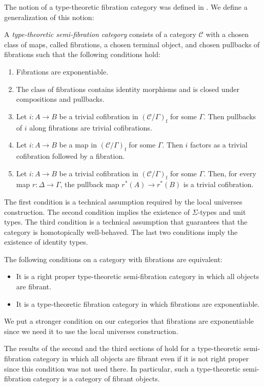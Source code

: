 \documentclass[reqno]{amsart}
\theoremstyle{definition}
\theoremstyle{remark}
\newcommand{\fs}[1]{\mathrm{#1}}
\newcommand{\scat}[1]{\mathcal{#1}}
\numberwithin{figure}{section}
\begin{document}
The notion of a type-theoretic fibration category was defined in \cite[Definition~2.1]{shul-inv}.
We define a generalization of this notion:
\begin{defn}[ttsfc]
A \emph{type-theoretic semi-fibration category} consists of a category $\scat{C}$ with a chosen class of maps, called fibrations, a chosen terminal object, and chosen pullbacks of fibrations such that the following conditions hold:
\begin{enumerate}
\item \label{it:ttsfc-pi} Fibrations are exponentiable.
\item \label{it:ttsfc-fib} The class of fibrations contains identity morphisms and is closed under compositions and pullbacks.
\item Let $i : A \to B$ be a trivial cofibration in $(\scat{C}/\Gamma)_\fs{f}$ for some $\Gamma$.
Then pullbacks of $i$ along fibrations are trivial cofibrations.
\item \label{it:ttsfc-factor} Let $i : A \to B$ be a map in $(\scat{C}/\Gamma)_\fs{f}$ for some $\Gamma$.
Then $i$ factors as a trivial cofibration followed by a fibration.
\item Let $i : A \to B$ be a trivial cofibration in $(\scat{C}/\Gamma)_\fs{f}$ for some $\Gamma$.
Then, for every map $r : \Delta \to \Gamma$, the pullback map $r^*(A) \to r^*(B)$ is a trivial cofibration.
\end{enumerate}
\end{defn}

The first condition is a technical assumption required by the local universes construction.
The second condition implies the existence of $\Sigma$-types and unit types.
The third condition is a technical assumption that guarantees that the category is homotopically well-behaved.
The last two conditions imply the existence of identity types.

The following conditions on a category with fibrations are equivalent:
\begin{itemize}
\item It is a right proper type-theoretic semi-fibration category in which all objects are fibrant.
\item It is a type-theoretic fibration category in which fibrations are exponentiable.
\end{itemize}
We put a stronger condition on our categories that fibrations are exponentiable since we need it to use the local universes construction.

\begin{remark}
The results of the second and the third sections of \cite{shul-inv} hold for a type-theoretic semi-fibration category in which all objects are fibrant even if it is not right proper since this condition was not used there.
In particular, such a type-theoretic semi-fibration category is a category of fibrant objects.
\end{remark}
\end{document}
